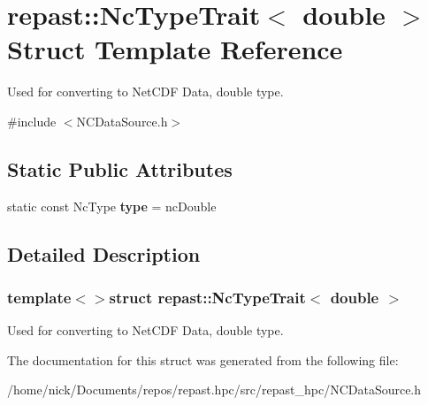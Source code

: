 \hypertarget{structrepast_1_1_nc_type_trait_3_01double_01_4}{\section{repast\-:\-:Nc\-Type\-Trait$<$ double $>$ Struct Template Reference}
\label{structrepast_1_1_nc_type_trait_3_01double_01_4}
}


Used for converting to Net\-C\-D\-F Data, double type.  




{\ttfamily \#include $<$N\-C\-Data\-Source.\-h$>$}

\subsection*{Static Public Attributes}
\begin{DoxyCompactItemize}
\item 
\hypertarget{structrepast_1_1_nc_type_trait_3_01double_01_4_a6cfe5fde4c4ad6e3c0d0bddb53642238}{static const Nc\-Type {\bfseries type} = nc\-Double}\label{structrepast_1_1_nc_type_trait_3_01double_01_4_a6cfe5fde4c4ad6e3c0d0bddb53642238}

\end{DoxyCompactItemize}


\subsection{Detailed Description}
\subsubsection*{template$<$$>$struct repast\-::\-Nc\-Type\-Trait$<$ double $>$}

Used for converting to Net\-C\-D\-F Data, double type. 

The documentation for this struct was generated from the following file\-:\begin{DoxyCompactItemize}
\item 
/home/nick/\-Documents/repos/repast.\-hpc/src/repast\-\_\-hpc/N\-C\-Data\-Source.\-h\end{DoxyCompactItemize}
